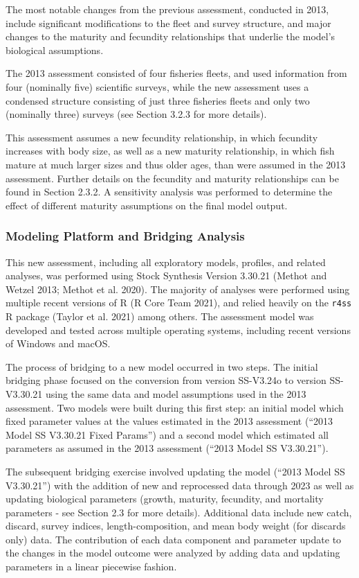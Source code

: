 \documentclass[11pt,
  english,
  letterpaper,
]{article}
\begin{document}
The most notable changes from the previous assessment, conducted in 2013, include significant modifications to the fleet and survey structure, and major changes to the maturity and fecundity relationships that underlie the model's biological assumptions.

The 2013 assessment consisted of four fisheries fleets, and used information from four (nominally five) scientific surveys, while the new assessment uses a condensed structure consisting of just three fisheries fleets and only two (nominally three) surveys (see Section 3.2.3 for more details).

This assessment assumes a new fecundity relationship, in which fecundity increases with body size, as well as a new maturity relationship, in which fish mature at much larger sizes and thus older ages, than were assumed in the 2013 assessment. Further details on the fecundity and maturity relationships can be found in Section 2.3.2. A sensitivity analysis was performed to determine the effect of different maturity assumptions on the final model output.

\hypertarget{modeling-platform-and-bridging-analysis}{%
\subsubsection{Modeling Platform and Bridging Analysis}\label{modeling-platform-and-bridging-analysis}}

This new assessment, including all exploratory models, profiles, and related analyses, was performed using Stock Synthesis Version 3.30.21 (Methot and Wetzel 2013; Methot et al. 2020). The majority of analyses were performed using multiple recent versions of R (R Core Team 2021), and relied heavily on the \texttt{r4ss} R package (Taylor et al. 2021) among others. The assessment model was developed and tested across multiple operating systems, including recent versions of Windows and macOS.

The process of bridging to a new model occurred in two steps. The initial bridging phase focused on the conversion from version SS-V3.24o to version SS-V3.30.21 using the same data and model assumptions used in the 2013 assessment. Two models were built during this first step: an initial model which fixed parameter values at the values estimated in the 2013 assessment (``2013 Model SS V3.30.21 Fixed Params'') and a second model which estimated all parameters as assumed in the 2013 assessment (``2013 Model SS V3.30.21'').

The subsequent bridging exercise involved updating the model (``2013 Model SS V3.30.21'') with the addition of new and reprocessed data through 2023 as well as updating biological parameters (growth, maturity, fecundity, and mortality parameters - see Section 2.3 for more details). Additional data include new catch, discard, survey indices, length-composition, and mean body weight (for discards only) data. The contribution of each data component and parameter update to the changes in the model outcome were analyzed by adding data and updating parameters in a linear piecewise fashion.
\end{document}

